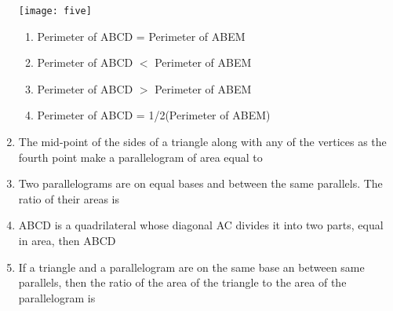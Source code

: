 \documentclass{article}
\begin{document}
\begin{enumerate}
\begin{center}
\texttt{[image: five]}
\end{center}
\begin{enumerate}
\item Perimeter of ABCD = Perimeter of ABEM
\item Perimeter of ABCD $<$ Perimeter of ABEM
\item Perimeter of ABCD $>$ Perimeter of ABEM
\item Perimeter of ABCD = 1/2(Perimeter of ABEM)
\end{enumerate}
\item The mid-point of the sides of a triangle along with any of the vertices as the fourth point make a parallelogram of area equal to
\begin{enumerate}
\end{enumerate}
\item Two parallelograms are on equal bases and between the same parallels. The ratio of their areas is
\begin{enumerate}
\end{enumerate}
\item ABCD is a quadrilateral whose diagonal AC divides it into two parts, equal in area, then ABCD
\begin{enumerate}
\end{enumerate}
\item If a triangle and a parallelogram are on the same base an between same parallels, then the ratio of the area of the triangle to the area of the parallelogram is

\end{enumerate}
\end{document}
